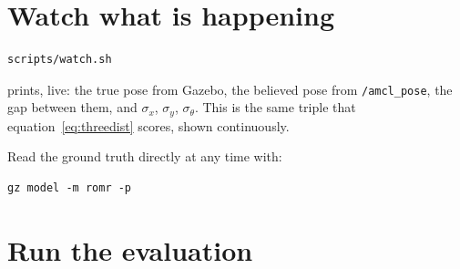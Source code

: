 \documentclass[11pt,a4paper]{report}
\newcommand{\file}[1]{\texttt{\small #1}}
\begin{document}
\section{Watch what is happening}

\begin{plain}[Terminal 5]
\begin{verbatim}
scripts/watch.sh
\end{verbatim}
prints, live: the true pose from Gazebo, the believed pose from
\file{/amcl\_pose}, the gap between them, and $\sigma_x$, $\sigma_y$,
$\sigma_\theta$. This is the same triple that
equation~\eqref{eq:threedist} scores, shown continuously.

Read the ground truth directly at any time with:
\begin{verbatim}
gz model -m romr -p
\end{verbatim}
\end{plain}

\section{Run the evaluation}
\end{document}
